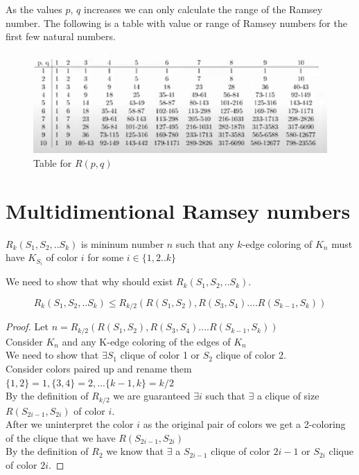  As the values $p$, $q$ increases we can only calculate the range of the Ramsey number. The following is a table with value or range of Ramsey numbers for the first few natural numbers.
 \begin{figure}[h!]
    \centering
    \includegraphics[width=1\linewidth]{images/RamseyTable.png}
    \caption{Table for $R(p,q)$}
\end{figure}


\section{Multidimentional Ramsey numbers}
\begin{definition}
$R_k(S_1,S_2,..S_k)$ is mininum number $n$ such that any $k$-edge coloring of $K_n$ must have $K_{S_i}$ of color $i$ for some $i \in \{1,2..k\}$
\end{definition}
We need to show that why should exist $R_k(S_1,S_2,..S_k)$.
\begin{claim}
$$R_k(S_1,S_2,..S_k) \leq R_{k/2}(R(S_1,S_2), R(S_3,S_4).... R(S_{k-1},S_k))$$
\end{claim}
\begin{proof}
Let $n =  R_{k/2}(R(S_1,S_2), R(S_3,S_4).... R(S_{k-1},S_k))$\\
Consider $K_n$ and any K-edge coloring of the edges of $K_n$\\

We need to show that $\exists S_1$ clique of color 1 or $S_2$ clique of color 2.\\
Consider colors paired up and rename them $\{1,2\} = 1, \{3,4\} = 2, ... \{k-1,k\} = k/2$ \\
By the definition of $R_{k/2}$ we are guaranteed $\exists i$ such that $\exists$ a clique of size $R(S_{2i-1},S_{2i})$ of color $i$.\\

After we uninterpret the color $i$ as the original pair of colors we get a 2-coloring of the clique that we have $R(S_{2i-1},S_{2i})$\\
By the definition of $R_2$ we know that $\exists$ a $S_{2i-1}$ clique of color $2i-1$ or $S_{2i}$ clique of color $2i$.
\end{proof}

